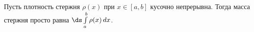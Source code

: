 
    	Пусть плотность стержня $\rho(x)$ при $x\in[a,b]$ кусочно непрерывна. Тогда масса стержня просто равна $\ds\int\limits_a^b\rho(x)\,dx$.
    